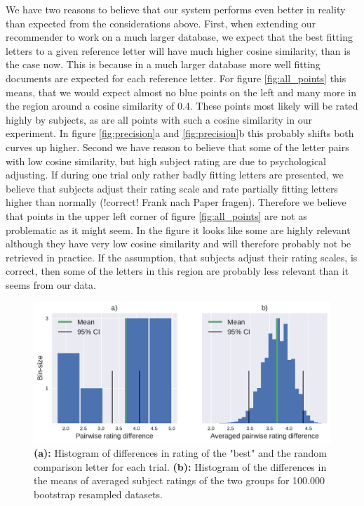 We have two reasons to believe that our system performs even better in reality than expected from the considerations above. First, when extending our recommender to work on a much larger database, we expect that the best fitting letters to a given reference letter will have much higher cosine similarity, than is the case now. This is because in a much larger database more well fitting documents are expected for each reference letter. For figure \ref{fig:all_points} this means, that we would expect almost no blue points on the left and many more in the region around a cosine similarity of 0.4. These points most likely will be rated highly by subjects, as are all points with such a cosine similarity in our experiment. In figure \ref{fig:precision}a and \ref{fig:precision}b this probably shifts both curves up higher. Second we have reason to believe that some of the letter pairs with low cosine similarity, but high subject rating are due to psychological adjusting. If during one trial only rather badly fitting letters are presented, we believe that subjects adjust their rating scale and rate partially fitting letters higher than normally (!correct! Frank nach Paper fragen). Therefore we believe that points in the upper left corner of figure \ref{fig:all_points} are not as problematic as it might seem. In the figure it looks like some are highly relevant although they have very low cosine similarity and will therefore probably not be retrieved in practice. If the assumption, that subjects adjust their rating scales, is correct, then some of the letters in this region are probably less relevant than it seems from our data.

\begin{figure}
	\includegraphics[width=\textwidth]{figures/both_diff_pv}
	
	\caption{\textbf{(a):} Histogram of differences in rating of the "best" and the random comparison letter for each trial.
		\textbf{(b):} Histogram of the differences in the means of averaged subject ratings of the two groups for 100.000 bootstrap resampled datasets.}
	\label{fig:both_diff_pv}
\end{figure}

